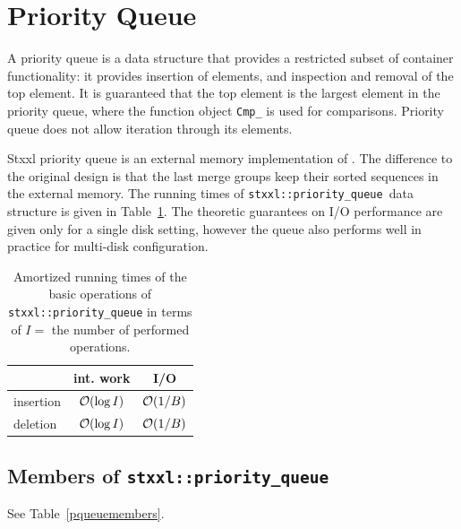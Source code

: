 \documentclass[twoside]{book}
\newcommand{\stxxl}{{\sc Stxxl} }
\begin{document}
\section{Priority Queue}
A priority queue is a data structure that provides a restricted subset of
container functionality: it provides insertion of elements, and
inspection and removal of the top element. It is guaranteed that the
top element is the largest element in the priority queue, where the
function object \texttt{Cmp\_} is used for comparisons.
Priority queue does not allow iteration through its elements. 

\newcommand{\xpqueue}{\texttt{stxxl::priority\_queue}}

\stxxl priority queue is an external memory implementation of
\cite{San00b}. The difference to the original design is that the
last merge groups keep their sorted sequences in the external memory.
The running times of \xpqueue\ data structure is given in
Table~\ref{rtpqueue}. The theoretic guarantees on I/O performance are
given only for a single disk setting, however the queue also performs
well in practice for multi-disk configuration.



\begin{table}[h]
\begin{center}
\caption{Amortized running times of the basic operations of \xpqueue
in terms of $I =$ the number of performed operations.}
\label{rtpqueue}
\begin{tabular}{|l|c|c|}
\hline
                    & int. work & I/O \\
\hline\hline
insertion           & $\mathcal{O}\!\left( \log I\right)$ & $\mathcal{O}\!\left( 1/B\right)$\\
\hline
deletion  & $\mathcal{O}\!\left( \log I\right)$ & $\mathcal{O}\!\left( 1/B\right)$ \\
\hline
\end{tabular}
\end{center}
\end{table}

\subsection{Members of \xpqueue}
See Table~\ref{pqueuemembers}.
\end{document}
